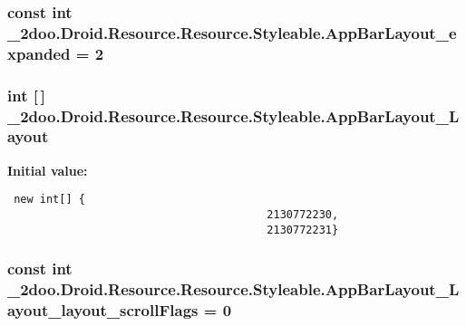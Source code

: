 \hypertarget{class__2doo_1_1_droid_1_1_resource_1_1_styleable_182908078b35f990d484c3f2f3664348}{
\subsubsection[{AppBarLayout\_\-expanded}]{\setlength{\rightskip}{0pt plus 5cm}const int \_\-2doo.Droid.Resource.Resource.Styleable.AppBarLayout\_\-expanded = 2}}
\label{class__2doo_1_1_droid_1_1_resource_1_1_styleable_182908078b35f990d484c3f2f3664348}


\hypertarget{class__2doo_1_1_droid_1_1_resource_1_1_styleable_667d000fa20573da822e030bd1c5e2f8}{
\subsubsection[{AppBarLayout\_\-Layout}]{\setlength{\rightskip}{0pt plus 5cm}int \mbox{[}$\,$\mbox{]} \_\-2doo.Droid.Resource.Resource.Styleable.AppBarLayout\_\-Layout}}
\label{class__2doo_1_1_droid_1_1_resource_1_1_styleable_667d000fa20573da822e030bd1c5e2f8}


\textbf{Initial value:}

\begin{Code}\begin{verbatim} new int[] {
                                        2130772230,
                                        2130772231}
\end{verbatim}
\end{Code}
\hypertarget{class__2doo_1_1_droid_1_1_resource_1_1_styleable_6c48db8b57e34a0a70c5edbf7f825a79}{
\subsubsection[{AppBarLayout\_\-Layout\_\-layout\_\-scrollFlags}]{\setlength{\rightskip}{0pt plus 5cm}const int \_\-2doo.Droid.Resource.Resource.Styleable.AppBarLayout\_\-Layout\_\-layout\_\-scrollFlags = 0}}
\label{class__2doo_1_1_droid_1_1_resource_1_1_styleable_6c48db8b57e34a0a70c5edbf7f825a79}


